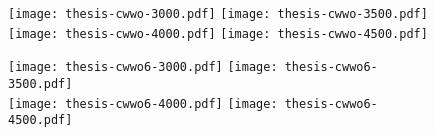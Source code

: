 \begin{figure}
    \texttt{[image: thesis-cwwo-3000.pdf]}\hfill
    \texttt{[image: thesis-cwwo-3500.pdf]}\hfill
    \\[\smallskipamount]
    \texttt{[image: thesis-cwwo-4000.pdf]}\hfill
    \texttt{[image: thesis-cwwo-4500.pdf]}\hfill
\end{figure}
\begin{figure}
    \texttt{[image: thesis-cwwo6-3000.pdf]}\hfill
    \texttt{[image: thesis-cwwo6-3500.pdf]}\hfill
    \\[\smallskipamount]
    \texttt{[image: thesis-cwwo6-4000.pdf]}\hfill
    \texttt{[image: thesis-cwwo6-4500.pdf]}\hfill
\end{figure}



\clearpage